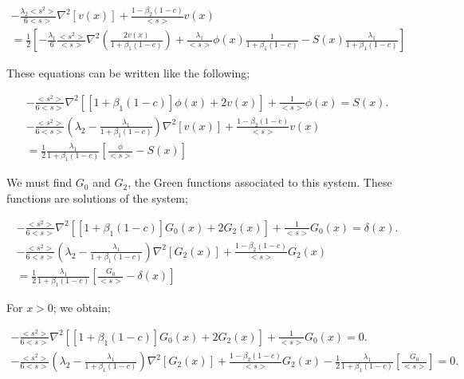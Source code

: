 \documentclass[preprint,12pt]{elsarticle}
\newcommand{\bl}{\big<}
\newcommand{\bg}{\big>}
\begin{document}
\begin{multline}
-\frac{\lambda_2 \bl s^2 \bg}{6\bl s \bg} \nabla^2 \left[v(x)\right] + \frac{1-\beta_2(1-c)}{\bl s \bg} v(x) \\= \frac{1}{2}\left[-\frac{\lambda_1}{6}\frac{\bl s^2 \bg}{\bl s \bg} \nabla^2\left(\frac{2v(x)}{1+\beta_1(1-c)}\right) + \frac{\lambda_1}{\bl s \bg}\phi(x)\frac{1}{1+\beta_1(1-c)}-S(x)\frac{\lambda_1}{1+\beta_1(1-c)}\right]
\end{multline}

These equations can be written like the following;

\begin{align}
-\frac{\bl s^2 \bg}{6\bl s \bg} \nabla^2 \left[\left[1+\beta_1(1-c)\right]\phi(x)+ 2v(x)\right] + \frac{1}{\bl s \bg} \phi(x) = S(x). \\
-\frac{\bl s^2 \bg}{6\bl s \bg}\left(\lambda_2 - \frac{\lambda_1}{1+\beta_1(1-c)}\right) \nabla^2 \left[v(x)\right] + \frac{1-\beta_2(1-c)}{\bl s \bg} v(x) \\= \frac{1}{2} \frac{\lambda_1}{1+\beta_1(1-c)}\left[\frac{\phi}{\bl s \bg} - S(x)\right]
\end{align}

We must find $G_0$ and $G_2$, the Green functions associated to this system. These functions are solutions of the system;

\begin{align}
-\frac{\bl s^2 \bg}{6\bl s \bg} \nabla^2 \left[\left[1+\beta_1(1-c)\right]G_0(x)+ 2G_2(x)\right] + \frac{1}{\bl s \bg}G_0(x) = \delta(x). \\
-\frac{\bl s^2 \bg}{6\bl s \bg}\left(\lambda_2 - \frac{\lambda_1}{1+\beta_1(1-c)}\right) \nabla^2 \left[G_2(x)\right] + \frac{1-\beta_2(1-c)}{\bl s \bg} G_2(x) \\= \frac{1}{2} \frac{\lambda_1}{1+\beta_1(1-c)}\left[\frac{G_0}{\bl s \bg} - \delta(x)\right]
\end{align}

For $x>0$; we obtain;

\begin{align}
-\frac{\bl s^2 \bg}{6\bl s \bg} \nabla^2 \left[\left[1+\beta_1(1-c)\right]G_0(x)+ 2G_2(x)\right] + \frac{1}{\bl s \bg}G_0(x) = 0. \\
-\frac{\bl s^2 \bg}{6\bl s \bg}\left(\lambda_2 - \frac{\lambda_1}{1+\beta_1(1-c)}\right) \nabla^2 \left[G_2(x)\right] + \frac{1-\beta_2(1-c)}{\bl s \bg} G_2(x) - \frac{1}{2} \frac{\lambda_1}{1+\beta_1(1-c)}\left[\frac{G_0}{\bl s \bg}\right] = 0.
\end{align}
\end{document}
